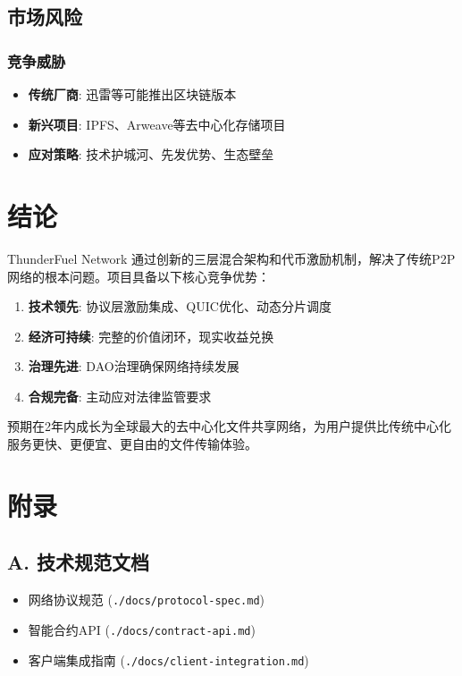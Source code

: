 \documentclass[12pt,a4paper]{article}
\begin{document}
\subsection{市场风险}

\subsubsection{竞争威胁}
\begin{itemize}
    \item \textbf{传统厂商}: 迅雷等可能推出区块链版本
    \item \textbf{新兴项目}: IPFS、Arweave等去中心化存储项目
    \item \textbf{应对策略}: 技术护城河、先发优势、生态壁垒
\end{itemize}

\section{结论}

ThunderFuel Network 通过创新的三层混合架构和代币激励机制，解决了传统P2P网络的根本问题。项目具备以下核心竞争优势：

\begin{enumerate}
    \item \textbf{技术领先}: 协议层激励集成、QUIC优化、动态分片调度
    \item \textbf{经济可持续}: 完整的价值闭环，现实收益兑换
    \item \textbf{治理先进}: DAO治理确保网络持续发展
    \item \textbf{合规完备}: 主动应对法律监管要求
\end{enumerate}

预期在2年内成长为全球最大的去中心化文件共享网络，为用户提供比传统中心化服务更快、更便宜、更自由的文件传输体验。

\section*{附录}

\subsection*{A. 技术规范文档}
\begin{itemize}
    \item 网络协议规范 (\texttt{./docs/protocol-spec.md})
    \item 智能合约API (\texttt{./docs/contract-api.md})
    \item 客户端集成指南 (\texttt{./docs/client-integration.md})
\end{itemize}
\end{document}
